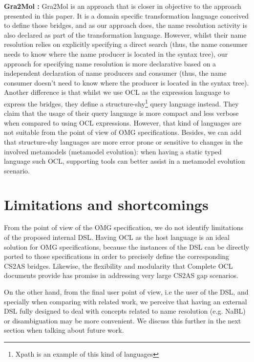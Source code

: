 \documentclass{llncs}
\begin{document}
\textbf{Gra2Mol \cite{canovas2012gra2mol}:}  Gra2Mol is an approach that is closer in objective to the approach presented in this paper. It is a domain specific transformation language conceived to define those bridges, and as our approach does, the name resolution activity is also declared as part of the transformation language. However, whilst their name resolution relies on explicitly specifying a direct search (thus, the name consumer needs to know where the name producer is located in the syntax tree), our approach for specifying name resolution is more declarative based on a independent declaration of name producers and consumer (thus, the name consumer doesn't need to know where the producer is located in the syntax tree). Another difference is that whilst we use OCL as the expression language to express the bridges, they define a structure-shy\footnote{Xpath is an example of this kind of languages} query language instead. They claim that the usage of their query language is more compact and less verbose when compared to using OCL expressions. However, that kind of languages are not suitable from the point of view of OMG specifications. Besides, we can add that structure-shy languages are more error prone or sensitive to changes in the involved metamodels (metamodel evolution): when having a static typed language such OCL, supporting tools can better assist in a metamodel evolution scenario.

\section{Limitations and shortcomings}
\label{sec:limitations}

From the point of view of the OMG specification, we do not identify limitations of the proposed internal DSL. Having OCL as the host language is an ideal solution for OMG specifications, because the instances of the DSL can be directly ported to those specifications in order to precisely define the corresponding CS2AS bridges. Likewise, the flexibility and modularity that Complete OCL documents provide has promise in addressing very large CS2AS gap scenarios.

On the other hand, from the final user point of view, i.e the user of the DSL, and specially when comparing with related work, we perceive that having an external DSL fully designed to deal with concepts related to name resolution (e.g. NaBL) or disambiguation may be more convenient. We discuss this further in the next section when talking about future work.
\end{document}
